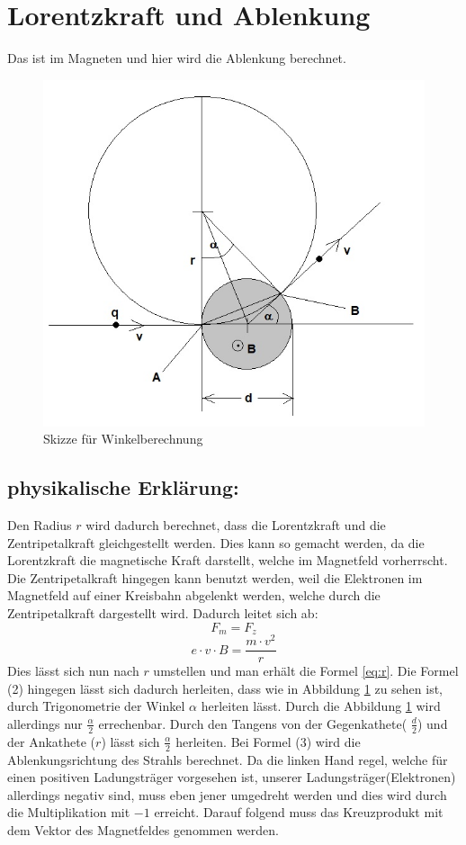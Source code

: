 \section{Lorentzkraft und Ablenkung}

Das ist im Magneten und hier wird die Ablenkung berechnet.
\begin{figure}
    \centering
    \includegraphics[width=.75\textwidth]{fig/elektronenstrahl-ablenkung_101.jpg}
    \caption{Skizze für Winkelberechnung}
    \label{fig:ausBlock}
\end{figure}

\subsection{physikalische Erklärung:}
Den Radius $r$ wird dadurch berechnet, dass die Lorentzkraft und die Zentripetalkraft gleichgestellt werden. Dies kann so gemacht werden, da die Lorentzkraft die magnetische Kraft darstellt, welche im Magnetfeld vorherrscht. Die Zentripetalkraft hingegen kann benutzt werden, weil die Elektronen im Magnetfeld auf einer Kreisbahn abgelenkt werden, welche durch die Zentripetalkraft dargestellt wird. Dadurch leitet sich ab:
$$ F_m=F_z$$
$$ e \cdot v \cdot B = \frac{m \cdot v^2}{r}$$
Dies lässt sich nun nach $r$ umstellen und man erhält die Formel \ref{eq:r}. Die Formel (2) hingegen lässt sich dadurch herleiten, dass wie in Abbildung \ref{fig:ausBlock} zu sehen ist, durch Trigonometrie der Winkel $\alpha$ herleiten lässt. Durch die Abbildung \ref{fig:ausBlock} wird allerdings nur $\frac{\alpha}{2}$ errechenbar. Durch den Tangens von der Gegenkathete( $ \frac{d}{2}$) und der Ankathete ($ r $) lässt sich $ \frac{\alpha}{2}$ herleiten. Bei Formel (3) wird die Ablenkungsrichtung des Strahls berechnet. Da die linken Hand regel, welche für einen positiven Ladungsträger vorgesehen ist, unserer Ladungsträger(Elektronen) allerdings negativ sind, muss eben jener umgedreht werden und dies wird durch die Multiplikation mit $ -1 $ erreicht. Darauf folgend muss das Kreuzprodukt mit dem Vektor des Magnetfeldes genommen werden.  

